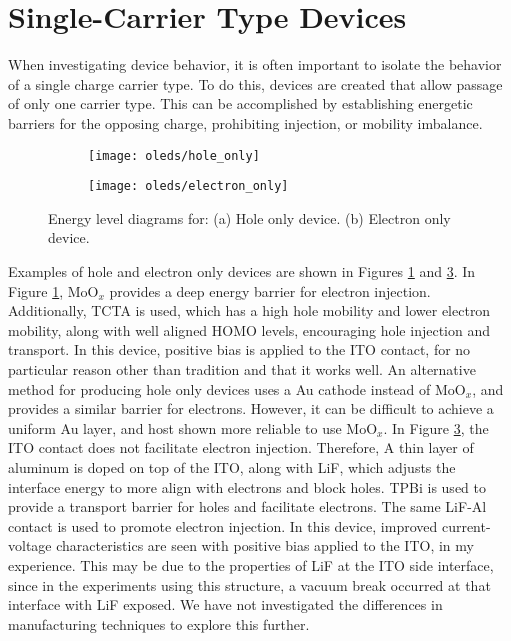 \documentclass[../thesis.tex]{subfiles}
\begin{document}
\section{Single-Carrier Type Devices}
When investigating device behavior, it is often important to isolate the behavior of a single charge carrier type.\supercite{Reineke2008,Reineke2007,Erickson2011}
To do this, devices are created that allow passage of only one carrier type.
This can be accomplished by establishing energetic barriers for the opposing charge, prohibiting injection, or mobility imbalance.
\begin{figure}[ht]
\centering
\begin{subfigure}{.4\textwidth}
\texttt{[image: oleds/hole\_only]}
\caption{}
\label{fig:oleds_hole_only}
\end{subfigure}
\begin{subfigure}{.4\textwidth}
\texttt{[image: oleds/electron\_only]}
\caption{}
\label{fig:oleds_electron_only}
\end{subfigure}
\caption{Energy level diagrams for: (a) Hole only device. (b) Electron only device.}
\end{figure}
Examples of hole and electron only devices are shown in Figures \ref{fig:oleds_hole_only} and \ref{fig:oleds_electron_only}.
In Figure \ref{fig:oleds_hole_only}, MoO$_x$ provides a deep energy barrier for electron injection.
Additionally, TCTA is used, which has a high hole mobility and lower electron mobility, along with well aligned HOMO levels, encouraging hole injection and transport.
In this device, positive bias is applied to the ITO contact, for no particular reason other than tradition and that it works well.
An alternative method for producing hole only devices uses a Au cathode instead of MoO$_x$, and provides a similar barrier for electrons.
However, it can be difficult to achieve a uniform Au layer, and host shown more reliable to use MoO$_x$.
In Figure \ref{fig:oleds_electron_only}, the ITO contact does not facilitate electron injection.  
Therefore, A thin layer of aluminum is doped on top of the ITO, along with LiF, which adjusts the interface energy to more align with electrons and block holes.
TPBi is used to provide a transport barrier for holes and facilitate electrons.  
The same LiF-Al contact is used to promote electron injection.
In this device, improved current-voltage characteristics are seen with positive bias applied to the ITO, in my experience.
This may be due to the properties of LiF at the ITO side interface, since in the experiments using this structure, a vacuum break occurred at that interface with LiF exposed.
We have not investigated the differences in manufacturing techniques to explore this further.
\end{document}
